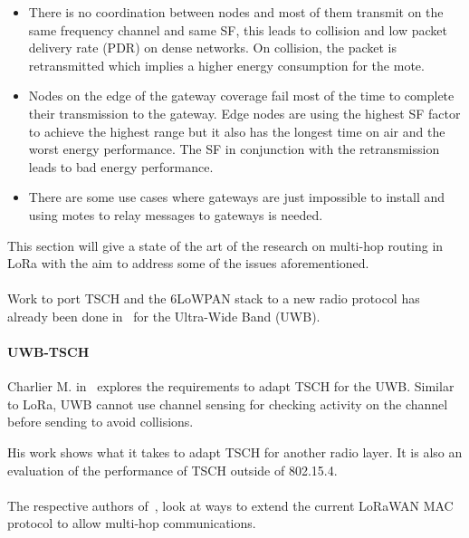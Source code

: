\begin{itemize}
  \item There is no coordination between nodes and most of them transmit on the
    same frequency channel and same SF, this leads to collision and low packet delivery
    rate (PDR) on dense networks. On collision, the packet is retransmitted
    which implies a higher energy consumption for the mote.
  \item Nodes on the edge of the gateway coverage fail most of the time to
    complete their transmission to the gateway. Edge nodes are using the
    highest SF factor to achieve the highest range but it also has
    the longest time on air and the worst energy performance.
    The SF in conjunction with the retransmission leads to bad energy performance.
  \item There are some use cases where gateways are just impossible to install
    and using motes to relay messages to gateways is needed.
\end{itemize}

This section will give a state of the art of the research on
multi-hop routing in LoRa with the aim to address some of the issues
aforementioned.

\paragraph{}

Work to port TSCH and the 6LoWPAN stack to a new radio protocol has already
been done in~\cite{uwbtsch} for the Ultra-Wide Band (UWB).

\paragraph{UWB-TSCH}

Charlier M. in~\cite{uwbtsch} explores the requirements to adapt TSCH for the UWB.
Similar to LoRa, UWB cannot use channel sensing for checking activity on the
channel before sending to avoid collisions.

His work shows what it takes to adapt TSCH for another radio layer.
It is also an evaluation of the performance of TSCH outside of 802.15.4.

\paragraph{}

The respective authors of~\cite{DIAS2018424, 8856256}, look at ways to extend
the current LoRaWAN MAC protocol to allow multi-hop communications.

